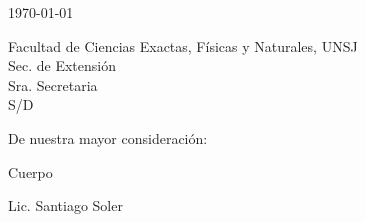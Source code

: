 \documentclass[a4paper,12pt]{article}
\begin{document}
\begin{flushright}
\today
\end{flushright}

\vspace{-1em}

\noindent Facultad de Ciencias Exactas, Físicas y Naturales, UNSJ\\ Sec. de Extensión\\ Sra. Secretaria\\ S/D

\vspace{1em}

\noindent De nuestra mayor consideración:

Cuerpo

\vspace{4em}
\begin{center}
Lic. Santiago Soler
\end{center}
\end{document}

